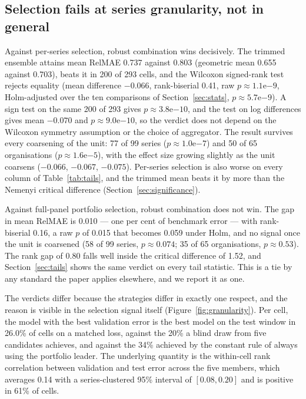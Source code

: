 \documentclass[11pt]{article}
\begin{document}
\subsection{Selection fails at series granularity, not in general}
\label{sec:granularity}

Against per-series selection, robust combination wins decisively. The trimmed ensemble attains mean RelMAE 0.737 against 0.803 (geometric mean 0.655 against 0.703), beats it in 200 of 293 cells, and the Wilcoxon signed-rank test rejects equality (mean difference $-0.066$, rank-biserial 0.41, raw $p \approx 1.1\mathrm{e}{-9}$, Holm-adjusted over the ten comparisons of Section~\ref{sec:stats}, $p \approx 5.7\mathrm{e}{-9}$). A sign test on the same 200 of 293 gives $p \approx 3.8\mathrm{e}{-10}$, and the test on log differences gives mean $-0.070$ and $p \approx 9.0\mathrm{e}{-10}$, so the verdict does not depend on the Wilcoxon symmetry assumption or the choice of aggregator. The result survives every coarsening of the unit: 77 of 99 series ($p \approx 1.0\mathrm{e}{-7}$) and 50 of 65 organisations ($p \approx 1.6\mathrm{e}{-5}$), with the effect size growing slightly as the unit coarsens ($-0.066$, $-0.067$, $-0.075$). Per-series selection is also worse on every column of Table~\ref{tab:tails}, and the trimmed mean beats it by more than the Nemenyi critical difference (Section~\ref{sec:significance}).

Against full-panel portfolio selection, robust combination does not win. The gap in mean RelMAE is 0.010 --- one per cent of benchmark error --- with rank-biserial 0.16, a raw $p$ of 0.015 that becomes 0.059 under Holm, and no signal once the unit is coarsened (58 of 99 series, $p \approx 0.074$; 35 of 65 organisations, $p \approx 0.53$). The rank gap of 0.80 falls well inside the critical difference of 1.52, and Section~\ref{sec:tails} shows the same verdict on every tail statistic. This is a tie by any standard the paper applies elsewhere, and we report it as one.

The verdicts differ because the strategies differ in exactly one respect, and the reason is visible in the selection signal itself (Figure~\ref{fig:granularity}). Per cell, the model with the best validation error is the best model on the test window in 26.0\% of cells on a matched loss, against the 20\% a blind draw from five candidates achieves, and against the 34\% achieved by the constant rule of always using the portfolio leader. The underlying quantity is the within-cell rank correlation between validation and test error across the five members, which averages 0.14 with a series-clustered 95\% interval of $[0.08, 0.20]$ and is positive in 61\% of cells.
\end{document}
